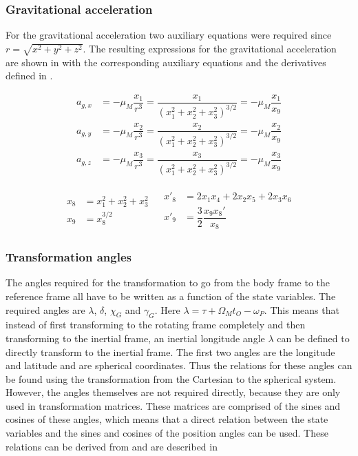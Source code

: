 \subsubsection{Gravitational acceleration}
 \label{subsubsec:tsiGravity} 
 For the gravitational acceleration two auxiliary equations were required since $r=\sqrt{x^{2}+y^{2}+z^{2}}$. The resulting expressions for the gravitational acceleration are shown in  with the corresponding auxiliary equations and the derivatives defined in .
 
 \begin{equation} \label{eq:gravAcc}
\begin{split}
a_{g,x} &= -\mu_{M}\dfrac{x_{1}}{r^{3}} = \dfrac{x_{1}}{\left(x_{1}^{2}+x_{2}^{2}+x_{3}^{2} \right)^{3/2}}=-\mu_{M}\dfrac{x_{1}}{x_{9}}\\
a_{g,y} &= -\mu_{M}\dfrac{x_{2}}{r^{3}} = \dfrac{x_{2}}{\left(x_{1}^{2}+x_{2}^{2}+x_{3}^{2} \right)^{3/2}}=-\mu_{M}\dfrac{x_{2}}{x_{9}}\\
a_{g,z} &= -\mu_{M}\dfrac{x_{3}}{r^{3}} = \dfrac{x_{3}}{\left(x_{1}^{2}+x_{2}^{2}+x_{3}^{2} \right)^{3/2}}=-\mu_{M}\dfrac{x_{3}}{x_{9}}
\end{split}
\end{equation}

\begin{align} \label{eq:gravAux}
\begin{split} 
x_{8}&=x_{1}^{2}+x_{2}^{2}+x_{3}^{2}\\
x_{9}&=x_{8}^{3/2}
\end{split} 
&
\begin{split}
x'_{8}&=2x_{1}x_{4}+2x_{2}x_{5}+2x_{3}x_{6}\\
x'_{9}&=\dfrac{3}{2}\dfrac{x_{9}x_{8}'}{x_{8}}
\end{split}
\end{align}
 
 
 
\subsubsection{Transformation angles}
\label{subsubsec:tsiTransAngl}
The angles required for the transformation to go from the body frame to the reference frame all have to be written as a function of the state variables. The required angles are $\lambda$, $\delta$, $\chi_{G}$ and $\gamma_{G}$. Here $\lambda = \tau + \Omega_{M}t_{O}-\omega_{P}$. This means that instead of first transforming to the rotating frame completely and then transforming to the inertial frame, an inertial longitude angle $\lambda$ can be defined to directly transform to the inertial frame. The first two angles are the longitude and latitude and are spherical coordinates. Thus the relations for these angles can be found using the transformation from the Cartesian to the spherical system. However, the angles themselves are not required directly, because they are only used in transformation matrices. These matrices are comprised of the sines and cosines of these angles, which means that a direct relation between the state variables and the sines and cosines of the position angles can be used. These relations can be derived from  and are described in 


